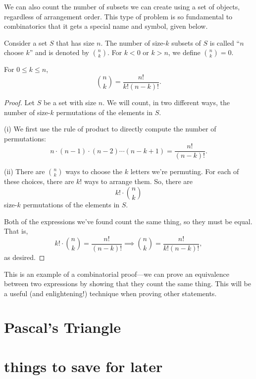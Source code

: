 \documentclass[../m55main.tex]{chapters}
\begin{document}
We can also count the number of subsets we can create using a set of objects, regardless of arrangement order.
This type of problem is so fundamental to combinatorics that it gets a special name and symbol, given below.

\begin{definition}[Combination]
    Consider a set $S$ that has size $n$.
    The number of size-$k$ subsets of $S$ is called ``$n$ choose $k$'' and is denoted by ${n \choose k}$.
    For $k < 0$ or $k > n$, we define ${n \choose k} = 0$.
\end{definition}

\begin{theorem}
    For $0 \leq k \leq n$,
    \[ {n \choose k} = \frac{n!}{k! (n-k)!}. \]
\end{theorem}

\begin{proof}
    Let $S$ be a set with size $n$.
    We will count, in two different ways, the number of size-$k$ permutations of the elements in $S$.
    \smallskip

    (i) We first use the rule of product to directly compute the number of permutations:
    \[ n \cdot (n-1) \cdot (n-2) \cdots (n-k+1) = \frac{n!}{(n-k)!}. \]

    (ii) There are ${n \choose k}$ ways to choose the $k$ letters we're permuting.
    For each of these choices, there are $k!$ ways to arrange them.
    So, there are
    \[ k! \cdot {n \choose k} \]
    size-$k$ permutations of the elements in $S$.
    \smallskip

    Both of the expressions we've found count the same thing, so they must be equal.
    That is,
    \[ k! \cdot {n \choose k} = \frac{n!}{(n-k)!} \implies {n \choose k} = \frac{n!}{k!(n-k)!}, \]
    as desired.
\end{proof}

This is an example of a combinatorial proof---we can prove an equivalence between two expressions by showing that they count the same thing.
This will be a useful (and enlightening!) technique when proving other statements.

\section{Pascal's Triangle}


\section{things to save for later}
\end{document}
